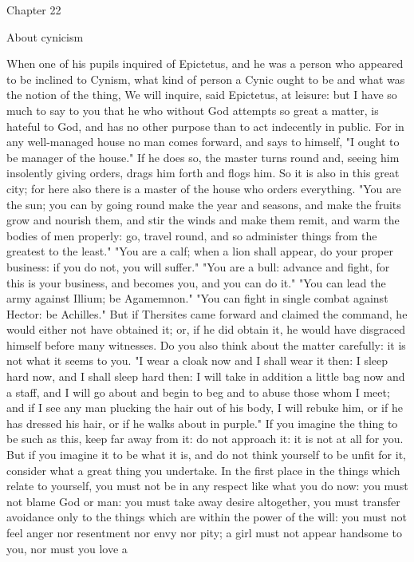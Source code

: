 \documentclass[a4paper]{article}
\begin{document}
Chapter 22

About cynicism

    When one of his pupils inquired of Epictetus, and he was a person who
appeared to be inclined to Cynism, what kind of person a Cynic ought to be and
what was the notion of the thing, We will inquire, said Epictetus, at leisure:
but I have so much to say to you that he who without God attempts so great a
matter, is hateful to God, and has no other purpose than to act indecently in
public. For in any well-managed house no man comes forward, and says to
himself, "I ought to be manager of the house." If he does so, the master turns
round and, seeing him insolently giving orders, drags him forth and flogs him.
So it is also in this great city; for here also there is a master of the house
who orders everything. "You are the sun; you can by going round make the year
and seasons, and make the fruits grow and nourish them, and stir the winds and
make them remit, and warm the bodies of men properly: go, travel round, and so
administer things from the greatest to the least." "You are a calf; when a lion
shall appear, do your proper business: if you do not, you will suffer." "You
are a bull: advance and fight, for this is your business, and becomes you, and
you can do it." "You can lead the army against Illium; be Agamemnon." "You can
fight in single combat against Hector: be Achilles." But if Thersites came
forward and claimed the command, he would either not have obtained it; or, if
he did obtain it, he would have disgraced himself before many witnesses.
    Do you also think about the matter carefully: it is not what it seems to
you. "I wear a cloak now and I shall wear it then: I sleep hard now, and I
shall sleep hard then: I will take in addition a little bag now and a staff,
and I will go about and begin to beg and to abuse those whom I meet; and if I
see any man plucking the hair out of his body, I will rebuke him, or if he has
dressed his hair, or if he walks about in purple." If you imagine the thing to
be such as this, keep far away from it: do not approach it: it is not at all
for you. But if you imagine it to be what it is, and do not think yourself to
be unfit for it, consider what a great thing you undertake.
    In the first place in the things which relate to yourself, you must not be
in any respect like what you do now: you must not blame God or man: you must
take away desire altogether, you must transfer avoidance only to the things
which are within the power of the will: you must not feel anger nor resentment
nor envy nor pity; a girl must not appear handsome to you, nor must you love a
\end{document}
